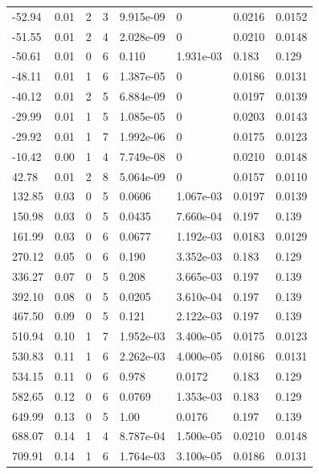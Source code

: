 \documentclass[preview]{standalone}
\begin{document}
{{\begin{tabular}{L{1.2cm}C{1.2cm} C{0.3cm}C{0.5cm} C{1.4cm}C{1.4cm} C{1.4cm}C{1.4cm}}
  -52.94  &  0.01  & 2     &  3 &  9.915e-09  & 0  & 0.0216 &  0.0152   \\ 
  -51.55  &  0.01  & 2     &  4 &  2.028e-09  & 0  & 0.0210 &  0.0148   \\ 
  -50.61  &  0.01  & 0     &  6 &  0.110  & 1.931e-03  & 0.183 &  0.129   \\ 
  -48.11  &  0.01  & 1     &  6 &  1.387e-05  & 0  & 0.0186 &  0.0131   \\ 
  -40.12  &  0.01  & 2     &  5 &  6.884e-09  & 0  & 0.0197 &  0.0139   \\ 
  -29.99  &  0.01  & 1     &  5 &  1.085e-05  & 0  & 0.0203 &  0.0143   \\ 
  -29.92  &  0.01  & 1     &  7 &  1.992e-06  & 0  & 0.0175 &  0.0123   \\ 
  -10.42  &  0.00  & 1     &  4 &  7.749e-08  & 0  & 0.0210 &  0.0148   \\ 
  42.78  &  0.01  & 2     &  8 &  5.064e-09  & 0  & 0.0157 &  0.0110   \\ 
  132.85  &  0.03  & 0     &  5 &  0.0606  & 1.067e-03  & 0.0197 &  0.0139   \\ 
  150.98  &  0.03  & 0     &  5 &  0.0435  & 7.660e-04  & 0.197 &  0.139   \\ 
  161.99  &  0.03  & 0     &  6 &  0.0677  & 1.192e-03  & 0.0183 &  0.0129   \\ 
  270.12  &  0.05  & 0     &  6 &  0.190  & 3.352e-03  & 0.183 &  0.129   \\ 
  336.27  &  0.07  & 0     &  5 &  0.208  & 3.665e-03  & 0.197 &  0.139   \\ 
  392.10  &  0.08  & 0     &  5 &  0.0205  & 3.610e-04  & 0.197 &  0.139   \\ 
  467.50  &  0.09  & 0     &  5 &  0.121  & 2.122e-03  & 0.197 &  0.139   \\ 
  510.94  &  0.10  & 1     &  7 &  1.952e-03  & 3.400e-05  & 0.0175 &  0.0123   \\ 
  530.83  &  0.11  & 1     &  6 &  2.262e-03  & 4.000e-05  & 0.0186 &  0.0131   \\ 
  534.15  &  0.11  & 0     &  6 &  0.978  & 0.0172  & 0.183 &  0.129   \\ 
  582.65  &  0.12  & 0     &  6 &  0.0769  & 1.353e-03  & 0.183 &  0.129   \\ 
  649.99  &  0.13  & 0     &  5 &  1.00  & 0.0176  & 0.197 &  0.139   \\ 
  688.07  &  0.14  & 1     &  4 &  8.787e-04  & 1.500e-05  & 0.0210 &  0.0148   \\ 
  709.91  &  0.14  & 1     &  6 &  1.764e-03  & 3.100e-05  & 0.0186 &  0.0131   \\ 

\end{tabular}}}
\end{document}
